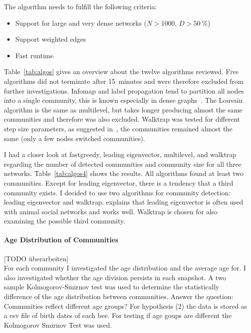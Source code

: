The algorithm needs to fulfill the following criteria:

\begin{itemize}
\item Support for large and very dense networks ($N>1000$, $D>50~\%$)
\item Support weighted edges
\item Fast runtime
\end{itemize}

Table~\ref{tab:algos} gives an overview about the twelve algorithms reviewed. Five algorithms did not terminate after 15~minutes and were therefore excluded from further investigations. Infomap and label propagation tend to partition all nodes into a single community, this is known especially in dense graphs~\cite{yang2016comparative, fortunato2010community}.
The Louvain algorithm is the same as multilevel, but takes longer producing almost the same communities and therefore was also excluded. Walktrap was tested for different step size parameters, as suggested in~\cite{pons2005computing}, the communities remained almost the same (only a few nodes switched communities). 

I had a closer look at fastgreedy, leading eigenvector, multilevel, and walktrap regarding the number of detected communities and community size for all three networks. Table~\ref{tab:algos4} shows the results. All algorithms found at least two communities. Except for leading eigenvector, there is a tendency that a third community exists.
I decided to use two algorithms for community detection: leading eigenvector and walktrap. \textcite{farine2015constructing} explains that leading eigenvector is often used with animal social networks and works well. Walktrap is chosen for also  examining the possible third community.




\paragraph{Age Distribution of Communities}
[TODO überarbeiten]\\
For each community I investigated the age distribution and the average age for. I also investigated whether the age division persists in each snapshot. A two sample Kolmogorov-Smirnov test was used to determine the statistically difference of the age distribution between communities.
Answer the question: Communities reflect different age groups?
For hypothesis (2) the data is stored as a csv file of birth dates of each bee. For testing if age goups are different the Kolmogorov Smirnov Test was used.\\

